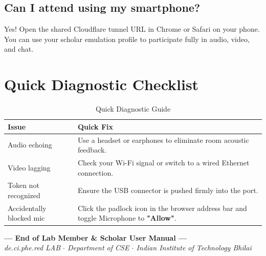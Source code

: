 \documentclass[11pt,a4paper]{report}
\begin{document}
\subsection{Can I attend using my smartphone?}
Yes! Open the shared Cloudflare tunnel URL in Chrome or Safari on your phone. You can use your scholar emulation profile to participate fully in audio, video, and chat.

\section{Quick Diagnostic Checklist}
\begin{table}[h!]
\centering
\small
\begin{tabularx}{\textwidth}{lX}
\toprule
\textbf{Issue} & \textbf{Quick Fix} \\
\midrule
Audio echoing & Use a headset or earphones to eliminate room acoustic feedback. \\
Video lagging & Check your Wi-Fi signal or switch to a wired Ethernet connection. \\
Token not recognized & Ensure the USB connector is pushed firmly into the port. \\
Accidentally blocked mic & Click the padlock icon in the browser address bar and toggle Microphone to \textbf{"Allow"}. \\
\bottomrule
\end{tabularx}
\caption{Quick Diagnostic Guide}
\end{table}

\vspace{2cm}
\begin{center}
\textbf{--- End of Lab Member \& Scholar User Manual ---}\\
\small \textit{de.ci.phe.red LAB $\cdot$ Department of CSE $\cdot$ Indian Institute of Technology Bhilai}
\end{center}
\end{document}
